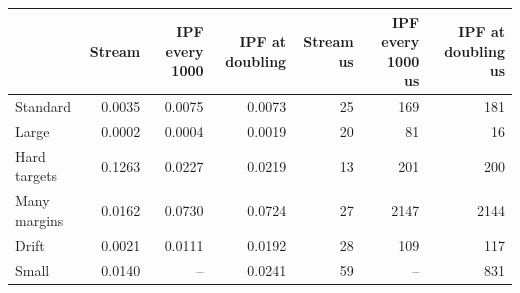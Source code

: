 \begin{tabular}{lrrrrrr}
\toprule
 & Stream & IPF every 1000 & IPF at doubling & Stream us & IPF every 1000 us & IPF at doubling us \\
\midrule
Standard & 0.0035 & 0.0075 & 0.0073 & 25 & 169 & 181 \\
Large & 0.0002 & 0.0004 & 0.0019 & 20 & 81 & 16 \\
Hard targets & 0.1263 & 0.0227 & 0.0219 & 13 & 201 & 200 \\
Many margins & 0.0162 & 0.0730 & 0.0724 & 27 & 2147 & 2144 \\
Drift & 0.0021 & 0.0111 & 0.0192 & 28 & 109 & 117 \\
Small & 0.0140 & -- & 0.0241 & 59 & -- & 831 \\
\bottomrule
\end{tabular}
